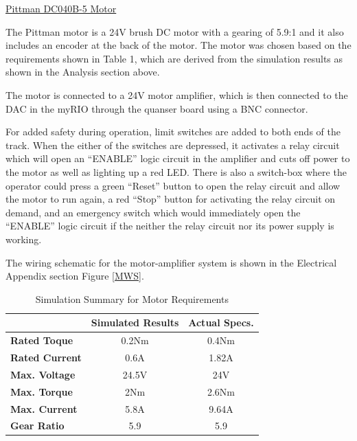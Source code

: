 \vspace{.167in}
\noindent\underline{Pittman DC040B-5 Motor}\par
\vspace{.08in}
The Pittman motor is a 24V brush DC motor with a gearing of 5.9:1 and it also includes an encoder at the back of the motor. The motor was chosen based on the requirements shown in Table 1, which are derived from the simulation results as shown in the Analysis section above. \par
The motor is connected to a 24V motor amplifier, which is then connected to the DAC in the myRIO through the quanser board using a BNC connector.\par
For added safety during operation, limit switches are added to both ends of the track. When the either of the switches are depressed, it activates a relay circuit which will open an ``ENABLE'' logic circuit in the amplifier and cuts off power to the motor as well as lighting up a red LED. There is also a switch-box where the operator could press a green ``Reset'' button to open the relay circuit and allow the motor to run again, a red ``Stop'' button for activating the relay circuit on demand, and an emergency switch which would immediately open the ``ENABLE'' logic circuit if the neither the relay circuit nor its power supply is working.\par
The wiring schematic for the motor-amplifier system is shown in the Electrical Appendix section Figure \ref{MWS}. \par

\begin{table}[]
\centering
\caption{Simulation Summary for Motor Requirements}
\label{Table 1}
\begin{tabular}{|l|c|c|}
\hline
                       & \textbf{Simulated Results} & \textbf{Actual Specs.} \\ \hline
\textbf{Rated Toque}   & 0.2Nm                      & 0.4Nm                  \\ \hline
\textbf{Rated Current} & 0.6A                       & 1.82A                  \\ \hline
\textbf{Max. Voltage}  & 24.5V                      & 24V                    \\ \hline
\textbf{Max. Torque}   & 2Nm                        & 2.6Nm                  \\ \hline
\textbf{Max. Current}  & 5.8A                       & 9.64A                  \\ \hline
\textbf{Gear Ratio}    & 5.9                        & 5.9                    \\ \hline
\end{tabular}
\end{table}

